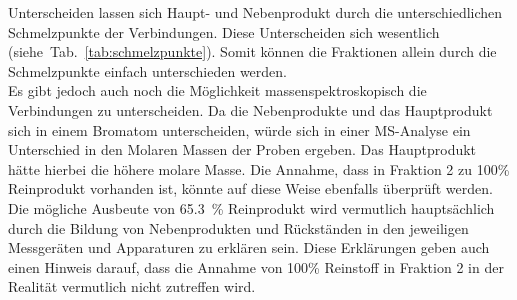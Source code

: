 Unterscheiden lassen sich Haupt- und Nebenprodukt durch die unterschiedlichen Schmelzpunkte der Verbindungen. Diese Unterscheiden sich wesentlich \mbox{(siehe Tab. \ref{tab:schmelzpunkte})}. Somit können die Fraktionen allein durch die Schmelzpunkte einfach unterschieden werden.\\
Es gibt jedoch auch noch die Möglichkeit massenspektroskopisch die Verbindungen zu unterscheiden. Da die Nebenprodukte und das Hauptprodukt sich in einem Bromatom unterscheiden, würde sich in einer MS-Analyse ein Unterschied in den Molaren Massen der Proben ergeben. Das Hauptprodukt hätte hierbei die höhere molare Masse. Die Annahme, dass in Fraktion 2 zu 100\% Reinprodukt vorhanden ist, könnte auf diese Weise ebenfalls überprüft werden.\\

Die mögliche Ausbeute von \SI{65,3}{\percent} Reinprodukt wird vermutlich hauptsächlich durch die Bildung von Nebenprodukten und Rückständen in den jeweiligen Messgeräten und Apparaturen zu erklären sein. Diese Erklärungen geben auch einen Hinweis darauf, dass die Annahme von 100\% Reinstoff in Fraktion 2 in der Realität vermutlich nicht zutreffen wird.

